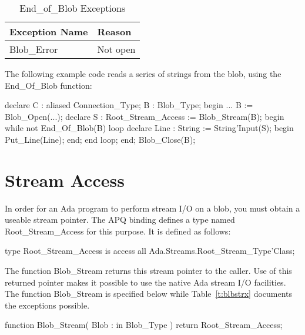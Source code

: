 \documentclass[english,letterpaper]{book}
\begin{document}
\begin{table}
   \begin{center}
      \begin{tabular}{ll}
         Exception Name    &  Reason\\
         \hline 
         Blob\_Error       &  Not open\\
      \end{tabular}
   \end{center}
   \caption{End\_of\_Blob Exceptions}\label{t:eoblbx}
\end{table}

The following example code reads a series of strings from the blob,
using the End\_Of\_Blob function:

\begin{Example}
declare
   C : aliased Connection_Type;
   B : Blob_Type;
begin
   ...
   B := Blob_Open(...);
   declare
      S : Root_Stream_Access := Blob_Stream(B);
   begin
      while not End_Of_Blob(B) loop
         declare
            Line : String := String'Input(S);
         begin
            Put_Line(Line);
         end;
      end loop;
   end;
   Blob_Close(B);
\end{Example}

\section{Stream Access}

In order for an Ada program to perform stream I/O
on a blob, you must obtain a useable stream pointer.
The APQ binding defines a type named Root\_Stream\_Access for
this purpose. It is defined as follows:

\begin{Code}

   type Root_Stream_Access is access all
      Ada.Streams.Root_Stream_Type'Class;

\end{Code}

The function Blob\_Stream returns this stream pointer to the caller.
Use of this returned pointer makes it possible to use the native Ada
stream I/O facilities. The function Blob\_Stream is 
specified below while Table~\ref{t:blbstrx} documents the exceptions
possible.

\begin{Code}
function Blob_Stream(
   Blob : in Blob_Type
) return Root_Stream_Access;
\end{Code}
\end{document}
